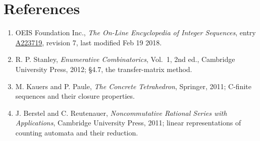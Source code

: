 \documentclass[11pt]{article}
\theoremstyle{definition}
\begin{document}
\section{References}

\begin{enumerate}

\item OEIS Foundation Inc., \emph{The On-Line Encyclopedia of Integer Sequences}, entry \href{https://oeis.org/A223719}{A223719}, revision 7, last modified Feb 19 2018.

\item R. P. Stanley, \emph{Enumerative Combinatorics}, Vol.~1, 2nd ed., Cambridge University Press, 2012; \S4.7, the transfer-matrix method.

\item M. Kauers and P. Paule, \emph{The Concrete Tetrahedron}, Springer, 2011; C-finite sequences and their closure properties.

\item J. Berstel and C. Reutenauer, \emph{Noncommutative Rational Series with Applications}, Cambridge University Press, 2011; linear representations of counting automata and their reduction.

\end{enumerate}
\end{document}
